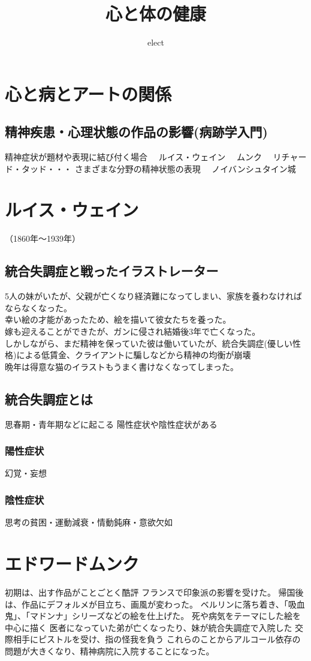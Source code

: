 \documentclass[a4j]{jarticle}
\title{心と体の健康}
\author{elect}
\begin{document}
\chapter{心と病とアートの関係}
\section{精神疾患・心理状態の作品の影響(病跡学入門)}
精神症状が題材や表現に結び付く場合
　ルイス・ウェイン
　ムンク
　リチャード・タッド・・・
さまざまな分野の精神状態の表現
　ノイバンシュタイン城
\chapter{ルイス・ウェイン}
（1860年～1939年）
\section{統合失調症と戦ったイラストレーター}
5人の妹がいたが、父親が亡くなり経済難になってしまい、家族を養わなければならなくなった。\\
幸い絵の才能があったため、絵を描いて彼女たちを養った。\\
嫁も迎えることができたが、ガンに侵され結婚後3年で亡くなった。\\
しかしながら、まだ精神を保っていた彼は働いていたが、統合失調症(優しい性格)による低賃金、クライアントに騙しなどから精神の均衡が崩壊\\
晩年は得意な猫のイラストもうまく書けなくなってしまった。\\
\section{統合失調症とは}
思春期・青年期などに起こる
陽性症状や陰性症状がある
\subsection{陽性症状}
幻覚・妄想
\subsection{陰性症状}
思考の貧困・運動減衰・情動鈍麻・意欲欠如

\chapter{エドワードムンク}
初期は、出す作品がことごとく酷評
フランスで印象派の影響を受けた。
帰国後は、作品にデフォルメが目立ち、画風が変わった。
ベルリンに落ち着き、「吸血鬼」、「マドンナ」シリーズなどの絵を仕上げた。
死や病気をテーマにした絵を中心に描く
医者になっていた弟が亡くなったり、妹が統合失調症で入院した
交際相手にピストルを受け、指の怪我を負う
\vec これらのことからアルコール依存の問題が大きくなり、精神病院に入院することになった。
\end{document}

